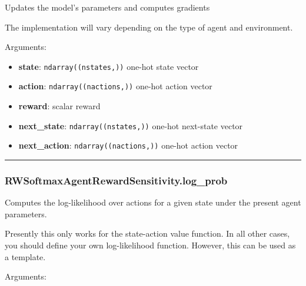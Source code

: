 \begin{Shaded}
\begin{Highlighting}[]
\end{Highlighting}
\end{Shaded}

Updates the model's parameters and computes gradients

The implementation will vary depending on the type of agent and
environment.

Arguments:

\begin{itemize}
\tightlist
\item
  \textbf{state}: \texttt{ndarray((nstates,))} one-hot state vector
\item
  \textbf{action}: \texttt{ndarray((nactions,))} one-hot action vector
\item
  \textbf{reward}: scalar reward
\item
  \textbf{next\_state}: \texttt{ndarray((nstates,))} one-hot next-state
  vector
\item
  \textbf{next\_action}: \texttt{ndarray((nactions,))} one-hot action
  vector
\end{itemize}

\begin{center}\rule{0.5\linewidth}{\linethickness}\end{center}

\subsubsection{RWSoftmaxAgentRewardSensitivity.log\_prob}\label{rwsoftmaxagentrewardsensitivity.log_prob}

\begin{Shaded}
\begin{Highlighting}[]
\end{Highlighting}
\end{Shaded}

Computes the log-likelihood over actions for a given state under the
present agent parameters.

Presently this only works for the state-action value function. In all
other cases, you should define your own log-likelihood function.
However, this can be used as a template.

Arguments:

